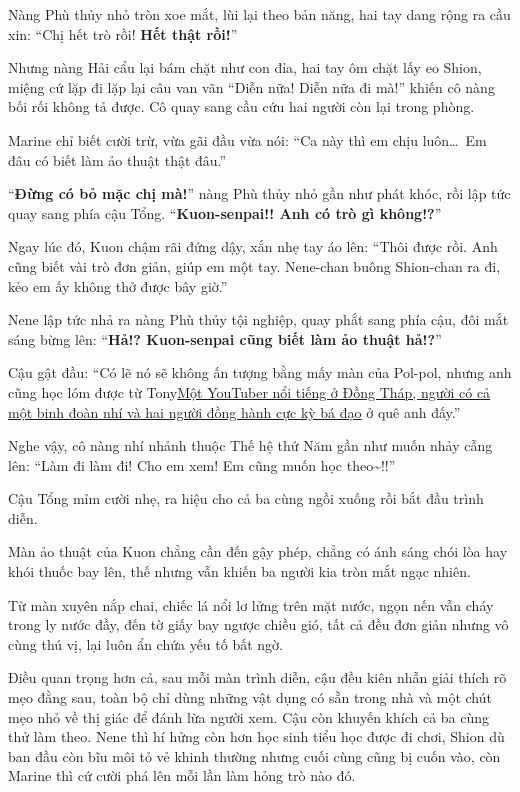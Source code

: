 \documentclass[../main.tex]{subfiles}
\begin{document}
Nàng Phù thủy nhỏ tròn xoe mắt, lùi lại theo bản năng, hai tay dang rộng ra cầu xin: ``Chị hết trò rồi! \textbf{Hết thật rồi!}''

Nhưng nàng Hải cẩu lại bám chặt như con đỉa, hai tay ôm chặt lấy eo Shion, miệng cứ lặp đi lặp lại câu van vãn ``Diễn nữa! Diễn nữa đi mà!'' khiến cô nàng bối rối không tả được. Cô quay sang cầu cứu hai người còn lại trong phòng.

Marine chỉ biết cười trừ, vừa gãi đầu vừa nói: ``Ca này thì em chịu luôn\dots\ Em đâu có biết làm ảo thuật thật đâu.''

``\textbf{Đừng có bỏ mặc chị mà!}'' nàng Phù thủy nhỏ gần như phát khóc, rồi lập tức quay sang phía cậu Tổng. ``\textbf{Kuon-senpai!! Anh có trò gì không!?}''

Ngay lúc đó, Kuon chậm rãi đứng dậy, xắn nhẹ tay áo lên: ``Thôi được rồi. Anh cũng biết vài trò đơn giản, giúp em một tay. Nene-chan buông Shion-chan ra đi, kẻo em ấy không thở được bây giờ.''

Nene lập tức nhả ra nàng Phù thủy tội nghiệp, quay phắt sang phía cậu, đôi mắt sáng bừng lên: ``\textbf{Hả!? Kuon-senpai cũng biết làm ảo thuật hả!?}''

Cậu gật đầu: ``Có lẽ nó sẽ không ấn tượng bằng mấy màn của Pol-pol, nhưng anh cũng học lóm được từ Tony\href{https://www.youtube.com/@T0NY94}{Một YouTuber nổi tiếng ở Đồng Tháp, người có cả một binh đoàn nhí và hai người đồng hành cực kỳ bá đạo} ở quê anh đấy.''

Nghe vậy, cô nàng nhí nhảnh thuộc Thế hệ thứ Năm gần như muốn nhảy cẫng lên: ``Làm đi làm đi! Cho em xem! Em cũng muốn học theo\~{}!!''

Cậu Tổng mỉm cười nhẹ, ra hiệu cho cả ba cùng ngồi xuống rồi bắt đầu trình diễn.

\ct

Màn ảo thuật của Kuon chẳng cần đến gậy phép, chẳng có ánh sáng chói lòa hay khói thuốc bay lên, thế nhưng vẫn khiến ba người kia tròn mắt ngạc nhiên.

Từ màn xuyên nắp chai, chiếc lá nổi lơ lửng trên mặt nước, ngọn nến vẫn cháy trong ly nước đầy, đến tờ giấy bay ngược chiều gió, tất cả đều đơn giản nhưng vô cùng thú vị, lại luôn ẩn chứa yếu tố bất ngờ.

Điều quan trọng hơn cả, sau mỗi màn trình diễn, cậu đều kiên nhẫn giải thích rõ mẹo đằng sau, toàn bộ chỉ dùng những vật dụng có sẵn trong nhà và một chút mẹo nhỏ về thị giác để đánh lừa người xem. Cậu còn khuyến khích cả ba cùng thử làm theo. Nene thì hí hửng còn hơn học sinh tiểu học được đi chơi, Shion dù ban đầu còn bĩu môi tỏ vẻ khinh thường nhưng cuối cùng cũng bị cuốn vào, còn Marine thì cứ cười phá lên mỗi lần làm hỏng trò nào đó.
\end{document}
